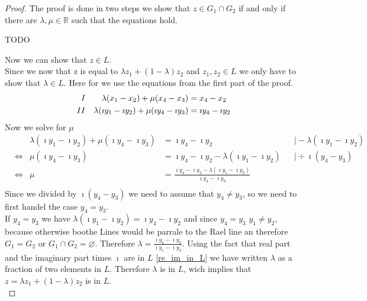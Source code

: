 \begin{proof}
    The proof is done in two steps we show that $z \in G_1 \cap G_2$ if and only if there are $\lambda, \mu \in \mathbb{R}$ such that the equations hold. 
    
    TODO %

    Now we can show that $z \in L$.\\
    Since we now that z is equal to $\lambda z_1 + (1-\lambda)z_2$ and $z_1, z_2 \in L$ we only have to show that $\lambda \in L$. Here for we use the equations from the first part of the proof.
    \begin{align*}
        \RNum{1} &&\lambda(x_1 - x_2)+\mu(x_4-x_3) &= x_4-x_2\\
        \RNum{2} &&\lambda(\imath y_1 - \imath y_2)+\mu(\imath y_4-\imath y_3) &= \imath y_4-\imath y_2
    \end{align*}
    Now we solve  for $\mu$ 
    \begin{align*}
        && \lambda(\imath y_1 - \imath y_2)+\mu(\imath y_4-\imath y_3) &= \imath y_4-\imath y_2 && \mid -\lambda(\imath y_1 - \imath y_2)\\
        &\Leftrightarrow & \mu(\imath y_4-\imath y_3) &= \imath y_4-\imath y_2 - \lambda(\imath y_1 - \imath y_2) && \mid \div \imath(y_4-y_3)\\
        &\Leftrightarrow & \mu &= \frac{\imath y_4-\imath y_2 - \lambda(\imath y_1 - \imath y_2)}{\imath y_4-\imath y_3}\\
    \end{align*}
    Since we divided by $\imath (y_4-y_3)$ we need to assume that $y_4 \ne y_3$, so we need to first handel the case $y_4 = y_3$.\\
    If $y_4 = y_3$ we have $\lambda(\imath y_1 - \imath y_2) = \imath y_4-\imath y_2$ and since $y_4 = y_3$ $y_1 \ne y_2$, because otherwise boothe Lines would be parrale to the Rael line an therefore $G_1 = G_2$ or $G_1 \cap G_2 = \varnothing$. Therefore $\lambda = \frac{\imath y_4-\imath y_2}{\imath y_1 - \imath y_2}$. Using the fact that real part and the imaginary part times $\imath$ are in $L$ \ref{re_im_in_L} we have written $\lambda$ as a fraction of two elements in $L$. Therefore $\lambda$ is in $L$, wich implies that $z = \lambda z_1 + (1-\lambda)z_2$ is in $L$.\\
   

\end{proof}
